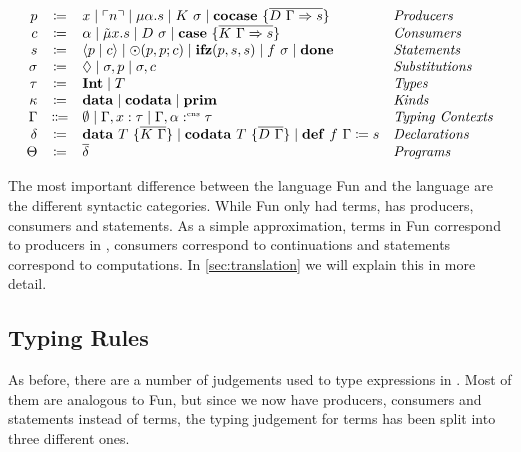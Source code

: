 \begin{definition}
  \[
    \begin{array}{rcll}
      p & \coloneqq & x \mid \lit{n} \mid \mu\alpha.s \mid K\ \sigma \mid \cocase{\overline{D\ \Gamma \Rightarrow s}} & \emph{Producers}\\
      c & \coloneqq & \alpha \mid \tilde{\mu}x.s \mid D\ \sigma \mid \case{\overline{K\ \Gamma \Rightarrow s}}& \emph{Consumers}\\
      s & \coloneqq & \cut{p}{c} \mid \odot(p, p; c) \mid \ifz{p}{s}{s} \mid f\ \sigma\mid \done & \emph{Statements}\\
      \sigma & \coloneqq & \nil \mid \sigma, p \mid \sigma, c & \emph{Substitutions}\\
      \tau & \coloneqq & \tyint \mid T & \emph{Types}\\
      \kappa & \coloneqq & \mathbf{data}\mid\mathbf{codata}\mid\mathbf{prim} & \emph{Kinds}\\
      \Gamma & \Coloneqq & \emptyset \mid \Gamma, x : \tau \mid \Gamma, \alpha \cnt \tau & \emph{Typing Contexts} \\
      \delta & \coloneqq & \mathbf{data}\ T\ \{ \overline{K\ \Gamma} \} \mid \mathbf{codata}\ T\ \{ \overline{D\ \Gamma }\} \mid \defi{f\ \Gamma}{s} & \emph{Declarations}\\
      \Theta & \coloneqq & \overline{\delta} & \emph{Programs}\\
    \end{array}
  \]
\end{definition}
The most important difference between the language Fun and the language \targetlang{} are the different syntactic categories.
While Fun only had terms, \targetlang{} has producers, consumers and statements. 
As a simple approximation, terms in Fun correspond to producers in \targetlang{}, consumers correspond to continuations and statements correspond to computations. 
In \cref{sec:translation} we will explain this in more detail.

\subsection{Typing Rules}
\label{subsec:core:typing-rules}

As before, there are a number of judgements used to type expressions in \targetlang{}. 
Most of them are analogous to Fun, but since we now have producers, consumers and statements instead of terms, the typing judgement for terms has been split into three different ones. 

